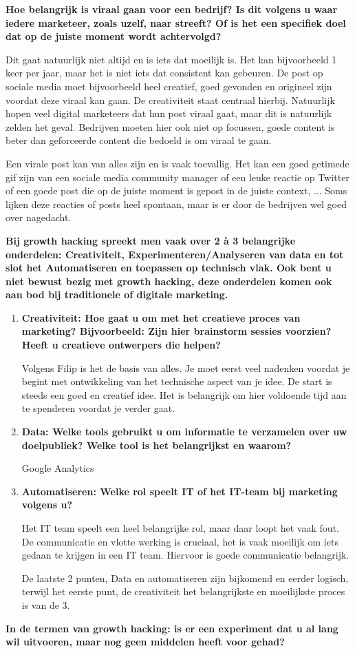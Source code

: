 \textbf{Hoe belangrijk is viraal gaan voor een bedrijf? Is dit volgens u waar iedere marketeer, zoals uzelf, naar streeft? Of is het een specifiek doel dat op de juiste moment wordt achtervolgd?}
	
Dit gaat natuurlijk niet altijd en is iets dat moeilijk is. Het kan bijvoorbeeld 1 keer per jaar, maar het is niet iets dat consistent kan gebeuren. De post op sociale media moet bijvoorbeeld heel creatief, goed gevonden en origineel zijn voordat deze viraal kan gaan. De creativiteit staat centraal hierbij. Natuurlijk hopen veel digital marketeers dat hun post viraal gaat, maar dit is natuurlijk zelden het geval. Bedrijven moeten hier ook niet op focussen, goede content is beter dan geforceerde content die bedoeld is om viraal te gaan.

Een virale post kan van alles zijn en is vaak toevallig. Het kan een goed getimede gif zijn van een sociale media community manager of een leuke reactie op Twitter of een goede post die op de juiste moment is gepost in de juiste context, ... Soms lijken deze reacties of posts heel spontaan, maar is er door de bedrijven wel goed over nagedacht.
	
\textbf{Bij growth hacking spreekt men vaak over 2 à 3 belangrijke onderdelen: Creativiteit, Experimenteren/Analyseren van data en tot slot het Automatiseren en toepassen op technisch vlak. Ook bent u niet bewust bezig met growth hacking, deze onderdelen komen ook aan bod bij traditionele of digitale marketing.}
\begin{enumerate}[label*=\arabic*.]
	\item \textbf{Creativiteit: Hoe gaat u om met het creatieve proces van marketing? Bijvoorbeeld: Zijn hier brainstorm sessies voorzien? Heeft u creatieve ontwerpers die helpen?}
	
	Volgens Filip is het de basis van alles. Je moet eerst veel nadenken voordat je begint met ontwikkeling van het technische aspect van je idee. De start is steeds een goed en creatief idee. Het is belangrijk om hier voldoende tijd aan te spenderen voordat je verder gaat.
	
	\item \textbf{Data: Welke tools gebruikt u om informatie te verzamelen over uw doelpubliek? Welke tool is het belangrijkst en waarom?}
	
	Google Analytics
	
	\item \textbf{Automatiseren: Welke rol speelt IT of het IT-team bij marketing volgens u? }
	
	Het IT team speelt een heel belangrijke rol, maar daar loopt het vaak fout. De communicatie en vlotte werking is cruciaal, het is vaak moeilijk om iets gedaan te krijgen in een IT team. Hiervoor is goede communicatie belangrijk.
	
	De laatste 2 punten, Data en automatiseren zijn bijkomend en eerder logisch, terwijl het eerste punt, de creativiteit het belangrijkste en moeilijkste proces is van de 3.
	
\end{enumerate}
\textbf{In de termen van growth hacking: is er een experiment dat u al lang wil uitvoeren, maar nog geen middelen heeft voor gehad?}

